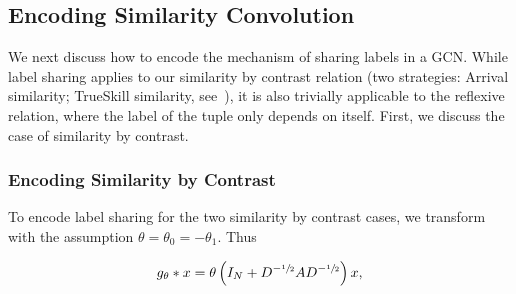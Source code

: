 



\subsection{Encoding Similarity Convolution}
\label{subsec:similar}
We next discuss how to encode the mechanism of sharing labels in a GCN. While label sharing applies to our similarity by contrast relation (two strategies: Arrival similarity; TrueSkill similarity, see~), it is also trivially applicable to the reflexive relation, where the label of the tuple only depends on itself. First, we discuss the case of similarity by contrast.

\subsubsection{Encoding Similarity by Contrast}
\label{sub:Encoding Similar Contrasts}

To encode label sharing for the two similarity by contrast cases, we transform~ with the assumption $\theta = \theta_0 = -\theta_1$. Thus

\begin{equation}
g_{\theta} * x = \theta\left(I_{N} + D^{-\sfrac{1}{2}}AD^{-\sfrac{1}{2}}\right) x, \label{eq:similargcn}
\end{equation}

